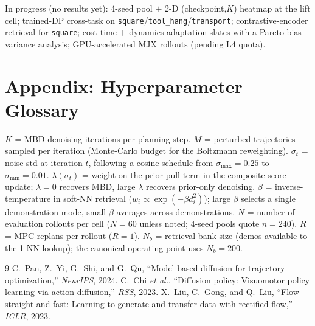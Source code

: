 \documentclass[letterpaper, 10 pt, conference]{ieeeconf}
\begin{document}
In progress (no results yet): 4-seed pool $+$ 2-D
(checkpoint,$K$) heatmap at the lift cell; trained-DP cross-task
on \texttt{square}/\texttt{tool\_hang}/\texttt{transport};
contrastive-encoder retrieval for \texttt{square}; cost-time
$+$ dynamics adaptation slates with a Pareto bias--variance
analysis; GPU-accelerated MJX rollouts (pending L4 quota).

\section*{Appendix: Hyperparameter Glossary}

$K$ = MBD denoising iterations per planning step.
$M$ = perturbed trajectories sampled per iteration (Monte-Carlo
budget for the Boltzmann reweighting).
$\sigma_t$ = noise std at iteration $t$, following a cosine
schedule from $\sigma_{\max}\!=\!0.25$ to $\sigma_{\min}\!=\!0.01$.
$\lambda(\sigma_t)$ = weight on the prior-pull term in the
composite-score update; $\lambda\!=\!0$ recovers MBD, large
$\lambda$ recovers prior-only denoising.
$\beta$ = inverse-temperature in soft-NN retrieval
($w_i\!\propto\!\exp(-\beta d_i^2)$); large $\beta$ selects a
single demonstration mode, small $\beta$ averages across
demonstrations.
$N$ = number of evaluation rollouts per cell ($N\!=\!60$ unless
noted; 4-seed pools quote $n\!=\!240$).
$R$ = MPC replans per rollout ($R\!=\!1$).
$N_b$ = retrieval bank size (demos available to the 1-NN
lookup); the canonical operating point uses $N_b\!=\!200$.

{\footnotesize
\renewcommand{\baselinestretch}{0.95}\selectfont
\begin{thebibliography}{9}\itemsep -1pt
 C.\ Pan, Z.\ Yi, G.\ Shi, and G.\ Qu, ``Model-based diffusion for trajectory optimization,'' \textit{NeurIPS}, 2024.
 C.\ Chi \textit{et al.}, ``Diffusion policy: Visuomotor policy learning via action diffusion,'' \textit{RSS}, 2023.
 X.\ Liu, C.\ Gong, and Q.\ Liu, ``Flow straight and fast: Learning to generate and transfer data with rectified flow,'' \textit{ICLR}, 2023.
\end{thebibliography}}
\end{document}
